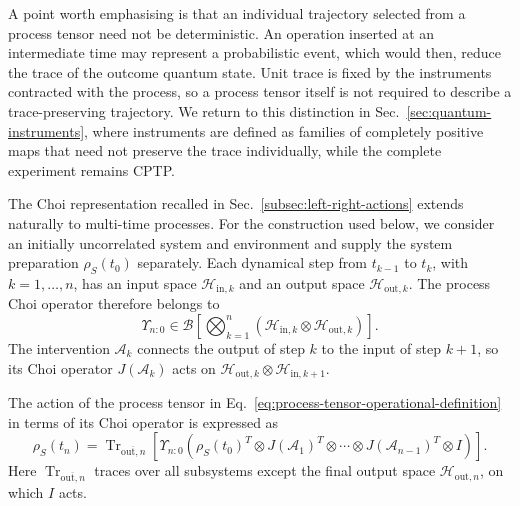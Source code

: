 A point worth emphasising is that an individual trajectory selected from a process tensor need not be deterministic.
An operation inserted at an intermediate time may represent a probabilistic event, which would then, reduce the trace of the outcome quantum state.
Unit trace is fixed by the instruments contracted with the process, so a process tensor itself is not required to describe a trace-preserving trajectory.
We return to this distinction in Sec.~\ref{sec:quantum-instruments}, where instruments are defined as families of completely positive maps that need not preserve the trace individually, while the complete experiment remains CPTP.

\label{subsec:choi-instruments}

The Choi representation recalled in Sec.~\ref{subsec:left-right-actions} extends naturally to multi-time processes.
For the construction used below, we consider an initially uncorrelated system and environment and supply the system preparation \(\rho_S(t_0)\) separately.
Each dynamical step from \(t_{k-1}\) to \(t_k\), with \(k=1,\ldots,n\), has an input space \(\mathcal{H}_{\mathrm{in},k}\) and an output space \(\mathcal{H}_{\mathrm{out},k}\).
The process Choi operator therefore belongs to
%
\begin{equation*}
    \Upsilon_{n:0} \in \mathcal{B}\left[\bigotimes_{k=1}^{n}(\mathcal{H}_{\mathrm{in},k} \otimes \mathcal{H}_{\mathrm{out},k})\right].
\end{equation*}
%
The intervention \(\mathcal{A}_k\) connects the output of step \(k\) to the input of step \(k+1\), so its Choi operator \(J(\mathcal{A}_k)\) acts on \(\mathcal H_{\mathrm{out},k}\otimes\mathcal H_{\mathrm{in},k+1}\).

The action of the process tensor in Eq.~\ref{eq:process-tensor-operational-definition} in terms of its Choi operator is expressed as
%
\begin{equation}
    \rho_S(t_n)
    = \operatorname{Tr}_{\overline{\mathrm{out},n}}[\Upsilon_{n:0}(\rho_S(t_0)^T \otimes J(\mathcal{A}_1)^T \otimes \cdots \otimes J(\mathcal{A}_{n-1})^T \otimes I)].
\end{equation}
%
Here \(\operatorname{Tr}_{\overline{\mathrm{out},n}}\) traces over all subsystems except the final output space \(\mathcal H_{\mathrm{out},n}\), on which \(I\) acts.

